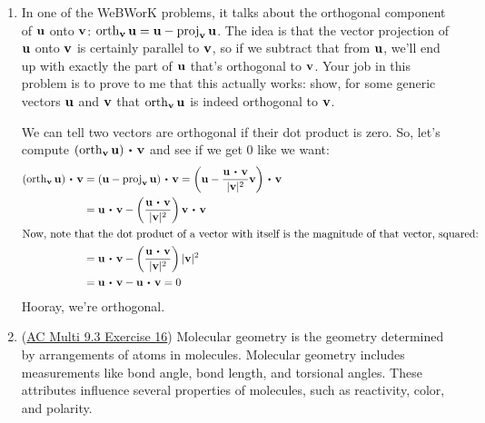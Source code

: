 \begin{enumerate}[leftmargin=0pt]
    \item In one of the WeBWorK problems, it talks about the orthogonal component of $\mathbf{u}$ onto $\mathbf{v}$:
		$\operatorname{orth}_{\mathbf{v}} \mathbf{u} = \mathbf{u} - \operatorname{proj}_{\mathbf{v}} \mathbf{u}$.
		The idea is that the vector projection of $\mathbf{u}$ onto $\mathbf{v}$ is certainly parallel to $\mathbf{v}$, so if we subtract that from $\mathbf{u}$, we'll end up with exactly the part of $\mathbf{u}$ that's orthogonal to $\mathbf{v}$. Your job in this problem is to prove to me that this actually works: show, for some generic vectors $\mathbf{u}$ and $\mathbf{v}$ that $\operatorname{orth}_{\mathbf{v}} \mathbf{u}$ is indeed orthogonal to $\mathbf{v}$.
		
		\begin{red}
			We can tell two vectors are orthogonal if their dot product is zero. So, let's compute $(\orth_\vv \vu) \dotp \vv$ and see if we get $0$ like we want:
			\begin{align*}
				(\orth_\vv \vu) \dotp \vv &= (\vu - \proj_\vv \vu) \dotp \vv 
				= \left(\vu - \frac{\vu\dotp\vv}{|\vv|^2}\vv \right) \dotp \vv \\
				&= \vu \dotp \vv - \left(\frac{\vu\dotp\vv}{|\vv|^2}\right)\vv\dotp\vv \\
				\intertext{Now, note that the dot product of a vector with itself is the magnitude of that vector, squared:}
				&= \vu \dotp \vv - \left(\frac{\vu\dotp\vv}{|\vv|^2}\right)|\vv|^2\\
				&= \vu \dotp \vv - \vu \dotp \vv = 0
			\end{align*}
			Hooray, we're orthogonal.
		\end{red}
	\item 
    \begin{minipage}[t]{0.5\linewidth}
    (\href{https://activecalculus.org/multi/S-9-3-Dot-Product.html#Ez_9_3_5}{AC Multi 9.3 Exercise 16}) Molecular geometry is the geometry determined by arrangements of atoms in molecules. Molecular geometry includes measurements like bond angle, bond length, and torsional angles. These attributes influence several properties of molecules, such as reactivity, color, and polarity.
    

\end{minipage}
\end{enumerate}
